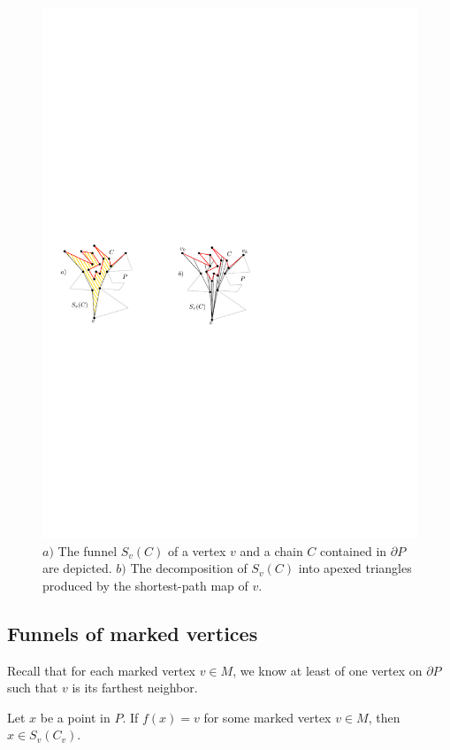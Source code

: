 \documentclass[a4paper,UKenglish]{lipics}
\newcommand{\fn}[2]{\ensuremath{S_{\scriptscriptstyle #1}(#2)}}
\newcommand{\ff}[1]{\ensuremath{f(#1)}}
\begin{document}
\begin{figure}[tb]
\centering
\includegraphics{img/Funnel.pdf}
\caption{\small $a)$ The funnel $\fn{v}{C}$ of a vertex $v$ and a chain $C$ contained in $\partial P$ are depicted.
$b)$ The decomposition of $\fn{v}{C}$ into apexed triangles produced by the shortest-path map of $v$.}
\label{fig:Funnels and decomposition}
\end{figure}

\subsection{Funnels of marked vertices}
Recall that for each marked vertex $v\in M$, we know at least of one vertex on $\partial P$ such that $v$ is its farthest neighbor.

\begin{lemma}\label{lemma:Farthest points from marked are in funnel}
Let $x$ be a point in $P$. If $\ff{x} = v$ for some marked vertex $v\in M$, then $x\in \fn{v}{C_v}$.
\end{lemma}
\end{document}
